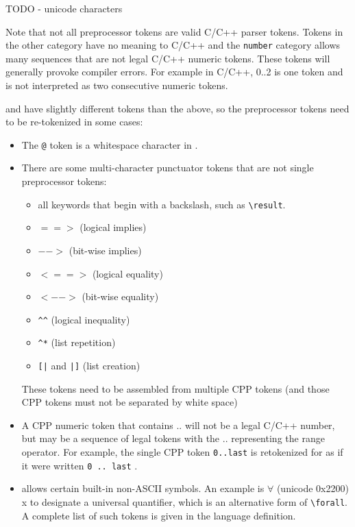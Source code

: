 TODO - unicode characters

Note that not all preprocessor tokens are valid C/C++ parser tokens. Tokens in the other category have no meaning to C/C++ and the \texttt{number} category allows many sequences that are not legal C/C++ numeric tokens. These tokens will generally provoke compiler errors. For example in C/C++, 0..2 is one token and is not interpreted as two consecutive numeric tokens.

\acsl and \acslpp have slightly different tokens than the above, so the preprocessor tokens need to be re-tokenized in some cases:
\begin{itemize}
	\item The \verb|@| token is a whitespace character in \acslb.
	\item There are some \acslb multi-character punctuator tokens that are not
	single preprocessor tokens:
	\begin{itemize}
        \item[] all \acslb keywords that begin with a backslash, such as
         \verb|\result|.
		\item[] $==>$ (logical implies)
		\item[] $-->$ (bit-wise implies)
		\item[] $<==>$ (logical equality)
		\item[] $<-->$ (bit-wise equality)
		\item[] \verb|^^| (logical inequality)
		\item[] \verb|^*| (list repetition)
		\item[] \verb:[|: and \verb:|]: (list creation)
	\end{itemize}
	These \acslb tokens need to be assembled from multiple CPP tokens (and those CPP tokens must not be separated by white space)
	\item A CPP numeric token that contains .. will not be a legal C/C++ number, but may be a sequence of
 legal \acslb tokens with the .. representing the range operator.  For example, the single CPP token \texttt{0..last} is retokenized for \acslb as if it were written \texttt{0 .. last} .
	\item \acslb allows certain built-in non-ASCII symbols.
    An example is 
		$\forall$ (unicode 0x2200) x to designate a universal quantifier,
    which is an alternative form of \verb|\forall|.
    A complete list of such tokens is given  in the \acslb language definition.
\end{itemize}

